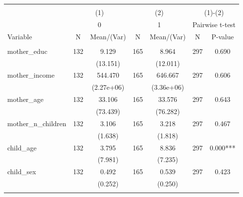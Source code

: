 
\begin{tabular}{@{\extracolsep{5pt}}lcccccc}
\\[-1.8ex]\hline \hline \\[-1.8ex]
 & \multicolumn{2}{c}{(1)}  & \multicolumn{2}{c}{(2)}  & \multicolumn{2}{c}{(1)-(2)} \\
 & \multicolumn{2}{c}{0}  & \multicolumn{2}{c}{1}  & \multicolumn{2}{c}{Pairwise t-test}  \\
Variable & N & Mean/(Var) & N & Mean/(Var) & N & P-value \\ \hline \\[-1.8ex] 
mother\_educ   & 132    & 9.129    & 165    & 8.964    & 297    & 0.690   \\
 &   & (13.151)  &   & (12.011)  &   &  \\ [1ex]
mother\_income   & 132    & 544.470    & 165    & 646.667    & 297    & 0.606   \\
 &   & (2.27e+06)  &   & (3.36e+06)  &   &  \\ [1ex]
mother\_age   & 132    & 33.106    & 165    & 33.576    & 297    & 0.643   \\
 &   & (73.439)  &   & (76.282)  &   &  \\ [1ex]
mother\_n\_children   & 132    & 3.106    & 165    & 3.218    & 297    & 0.467   \\
 &   & (1.638)  &   & (1.818)  &   &  \\ [1ex]
child\_age   & 132    & 3.795    & 165    & 8.836    & 297    & 0.000***   \\
 &   & (7.981)  &   & (7.235)  &   &  \\ [1ex]
child\_sex   & 132    & 0.492    & 165    & 0.539    & 297    & 0.423   \\
 &   & (0.252)  &   & (0.250)  &   &  \\ [1ex]
\hline \hline \\[-1.8ex]

\end{tabular}
